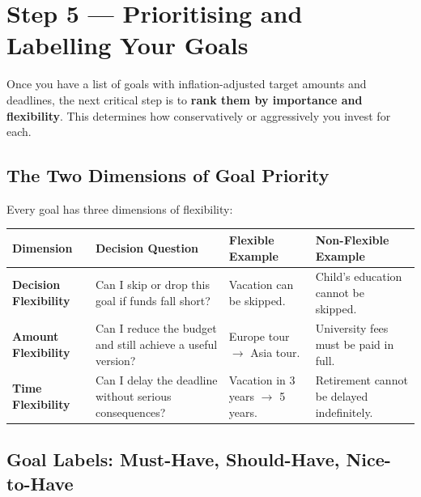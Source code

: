 \documentclass[12pt,a4paper]{article}
\begin{document}
\section{Step 5 --- Prioritising and Labelling Your Goals}

Once you have a list of goals with inflation-adjusted target amounts and deadlines, the next critical step is to \textbf{rank them by importance and flexibility}. This determines how conservatively or aggressively you invest for each.

\subsection{The Two Dimensions of Goal Priority}

Every goal has three dimensions of flexibility:

\begin{center}
\begingroup
\renewcommand{\arraystretch}{1.55}
\setlength{\tabcolsep}{5pt}
\begin{tabularx}{\linewidth}{@{}B{3.0cm} >{\raggedright\arraybackslash}X L{3.4cm} L{3.4cm}@{}}
\textbf{Dimension} & \textbf{Decision Question} & \textbf{Flexible Example} & \textbf{Non-Flexible Example}\\
\midrule
{}\textbf{Decision Flexibility}
& Can I skip or drop this goal if funds fall short?
& Vacation can be skipped.
& Child's education cannot be skipped.\\[5pt]
\textbf{Amount Flexibility}
& Can I reduce the budget and still achieve a useful version?
& Europe tour $\to$ Asia tour.
& University fees must be paid in full.\\[5pt]
\textbf{Time Flexibility}
& Can I delay the deadline without serious consequences?
& Vacation in 3 years $\to$ 5 years.
& Retirement cannot be delayed indefinitely.\\
\bottomrule
\end{tabularx}
\endgroup
\end{center}

\vspace{3mm}

\subsection{Goal Labels: Must-Have, Should-Have, Nice-to-Have}
\end{document}

